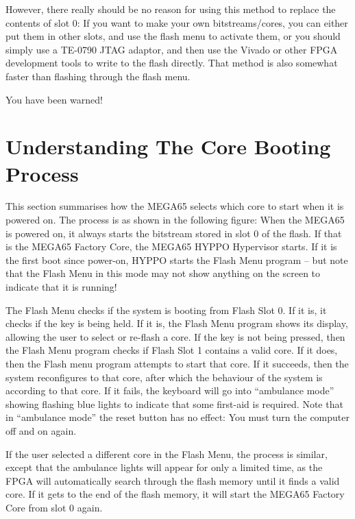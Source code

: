 However, there really should be no reason for using this method to replace the contents of slot 0:
If you want to make your own bitstreams/cores, you can either put them in other slots, and use the
flash menu to activate them, or you should simply use a TE-0790 JTAG adaptor, and then use
the Vivado or other FPGA development tools to write to the flash directly.  That method is also
somewhat faster than flashing through the flash menu.

You have been warned!

\section{Understanding The Core Booting Process}

This section summarises how the MEGA65 selects which core to start when it is powered on.
The process is as shown in the following figure: When the MEGA65 is
powered on, it always starts the bitstream stored in slot 0 of the
flash.  If that is the MEGA65 Factory Core, the MEGA65 HYPPO
Hypervisor starts.  If it is the first boot since power-on, HYPPO
starts the Flash Menu program -- but note that the Flash Menu in
this mode may not show anything on the screen to indicate that it is
running!

The Flash Menu checks if the system is booting from Flash
Slot 0.  If it is, it checks if the  key is being held.  If
it is, the Flash Menu program shows its display, allowing the user
to select or re-flash a core. If the  key is not being
pressed, then the Flash Menu program checks if Flash Slot 1 contains a valid
core.  If it does, then the Flash menu program attempts to start
that core.  If it succeeds, then the system reconfigures to that core,
after which the behaviour of the system is according to that core. If
it fails, the keyboard will go into ``ambulance mode'' showing flashing blue
lights to indicate that some first-aid is required.  Note that in ``ambulance
mode'' the reset button has no effect: You must turn the computer off
and on again.

If the user selected a different core in the Flash Menu, the process
is similar, except that the ambulance lights will appear for only a
limited time, as the FPGA will automatically search through the flash
memory until it finds a valid core. If it gets to the end of the flash
memory, it will start the MEGA65 Factory Core from slot 0 again.

